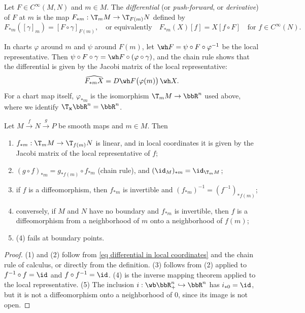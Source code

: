 \begin{defn}[Differential]
    Let $F\in C^\infty(M,N)$ and $m\in M$. The \emph{differential} (or \emph{push-forward}, or \emph{derivative}) of $F$ at $m$ is the map $F_{\ast m}:\T_mM\to\T_{F(m)}N$ defined by
    \[F_{\ast m}([\gamma]_m)=[F\circ\gamma]_{F(m)},\quad\text{or equivalently}\quad F_{\ast m}(X)[f]=X[f\circ F]\quad\text{for }f\in C^\infty(N).\]
\end{defn}
In charts $\varphi$ around $m$ and $\psi$ around $F(m)$, let $\wh F=\psi\circ F\circ\varphi^{-1}$ be the local representative. Then $\psi\circ F\circ\gamma=\wh F\circ(\varphi\circ\gamma)$, and the chain rule shows that the differential is given by the Jacobi matrix of the local representative:
\[\widehat{F_{\ast m}X}=D\wh F\big(\varphi(m)\big)\,\wh X.\label{eq differential in local coordinates}\]
For a chart map itself, $\varphi_{\ast m}$ is the isomorphism $\T_mM\to\bbR^n$ used above, where we identify $\T_{\bf{x}}\bbR^n=\bbR^n$.

\begin{thm}\label{prop of push-forwards}
    Let $M\overset{f}{\to}N\overset{g}{\to}P$ be smooth maps and $m\in M$. Then
    \begin{enumerate}
        \item $f_{\ast m}:\T_mM\to\T_{f(m)}N$ is linear, and in local coordinates it is given by the Jacobi matrix of the local representative of $f$;
        \item $(g\circ f)_{\ast m}=g_{\ast f(m)}\circ f_{\ast m}$ (chain rule), and $(\id_M)_{\ast m}=\id_{\T_mM}$;
        \item if $f$ is a diffeomorphism, then $f_{\ast m}$ is invertible and $(f_{\ast m})^{-1}=(f^{-1})_{\ast f(m)}$;
        \item conversely, if $M$ and $N$ have no boundary and $f_{\ast m}$ is invertible, then $f$ is a diffeomorphism from a neighborhood of $m$ onto a neighborhood of $f(m)$;
        \item (4) fails at boundary points.
    \end{enumerate}
\end{thm}
\begin{proof}
    (1) and (2) follow from \eqref{eq differential in local coordinates} and the chain rule of calculus, or directly from the definition. (3) follows from (2) applied to $f^{-1}\circ f=\id$ and $f\circ f^{-1}=\id$. (4) is the inverse mapping theorem applied to the local representative. (5) The inclusion $i:\wb\bbR^n_+\hookrightarrow\bbR^n$ has $i_{\ast0}=\id$, but it is not a diffeomorphism onto a neighborhood of $0$, since its image is not open.
\end{proof}


